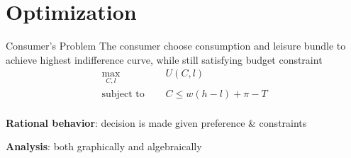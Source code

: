 \documentclass[11pt,aspectratio=169,usenames,dvipsnames]{beamer}
\let\tempone\itemize
\let\temptwo\enditemize
\renewenvironment{itemize}{\tempone\addtolength{\itemsep}{\fill}}{\temptwo}
\begin{document}
\section{Optimization}
\label{sec:Optimization}

\begin{frame}{Consumer's Problem}
\label{slide:Consumer_s_Problem}
    The consumer choose \alert{consumption} and \alert{leisure} bundle to achieve \alert{highest} indifference curve, while still satisfying \alert{budget constraint}
     \begin{equation}
     \label{eq:HHProblem}
         \begin{split}
             \max_{C, l} \quad
                 & U( C, l )
             \\
             \text{subject to } \quad
                & C \le w( h - l ) + \pi - T
            \\
         \end{split}
     \end{equation}
     \begin{itemize}
         \item \textbf{Rational behavior}: decision is made given preference \& constraints
         \item \textbf{Analysis}: both \alert{graphically} and \alert{algebraically}
     \end{itemize}
\end{frame}
\end{document}
